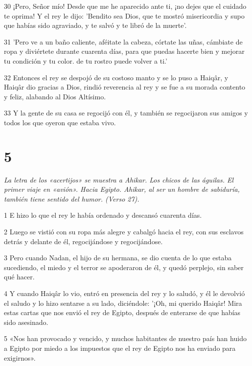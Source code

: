 \par 30 ¡Pero, Señor mío! Desde que me he aparecido ante ti, ¡no dejes que el cuidado te oprima! Y el rey le dijo: 'Bendito sea Dios, que te mostró misericordia y supo que habías sido agraviado, y te salvó y te libró de la muerte'.

\par 31 'Pero ve a un baño caliente, aféitate la cabeza, córtate las uñas, cámbiate de ropa y diviértete durante cuarenta días, para que puedas hacerte bien y mejorar tu condición y tu color. de tu rostro puede volver a ti.'

\par 32 Entonces el rey se despojó de su costoso manto y se lo puso a Haiqâr, y Haiqâr dio gracias a Dios, rindió reverencia al rey y se fue a su morada contento y feliz, alabando al Dios Altísimo.

\par 33 Y la gente de su casa se regocijó con él, y también se regocijaron sus amigos y todos los que oyeron que estaba vivo.

\chapter{5}

\par \textit{La letra de los «acertijos» se muestra a Ahikar. Los chicos de las águilas. El primer viaje en «avión». Hacia Egipto. Ahikar, al ser un hombre de sabiduría, también tiene sentido del humor. (Verso 27).}

\par 1 E hizo lo que el rey le había ordenado y descansó cuarenta días.

\par 2 Luego se vistió con su ropa más alegre y cabalgó hacia el rey, con sus esclavos detrás y delante de él, regocijándose y regocijándose.

\par 3 Pero cuando Nadan, el hijo de su hermana, se dio cuenta de lo que estaba sucediendo, el miedo y el terror se apoderaron de él, y quedó perplejo, sin saber qué hacer.

\par 4 Y cuando Haiqâr lo vio, entró en presencia del rey y lo saludó, y él le devolvió el saludo y lo hizo sentarse a su lado, diciéndole: '¡Oh, mi querido Haiqâr! Mira estas cartas que nos envió el rey de Egipto, después de enterarse de que habías sido asesinado.

\par 5 «Nos han provocado y vencido, y muchos habitantes de nuestro país han huido a Egipto por miedo a los impuestos que el rey de Egipto nos ha enviado para exigirnos».

